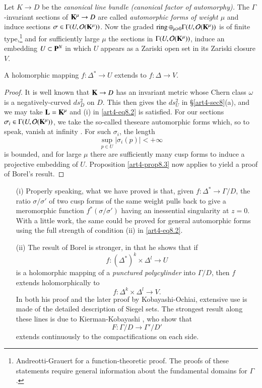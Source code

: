 Let $K \to D$ be the \textit{canonical line bundle (canonical factor of automorphy).} The $\Gamma$-invariant sections of $\mathbf{K}^\mu \to D$ are called \textit{automorphic forms of weight $\mu$} and induce sections $\sigma \in \Gamma (U, \mathcal{O} (\mathbf{K}^\mu))$. Now the graded $\operatorname{ring} \oplus_{\mu \geqslant 0} \Gamma (U, \mathcal{O}(\mathbf{K}^\mu))$ is of finite type,\footnote[36]{\cf Andreotti-Grauert \cite{art4-key1} for a function-theoretic proof. The proofs of these statements require general information about the fundamental domains for $\Gamma$.} and for sufficiently large $\mu$ the sections in $\Gamma (U,\mathcal{O} (\mathbf{K}^\mu))$, induce an embedding $U \subset \mathbf{P}^N$ in which $U$ appears as a Zariski open set in its Zariski closure $V$.

\setcounter{proposition}{11}
\begin{proposition}[Borel]\label{art4-eq8.12}
A holomorphic mapping $f : \Delta^\ast \to U$ extends to $f : \Delta \to V$.
\end{proposition}

\begin{proof}
It is well known that $\mathbf{K} \to D$ has an invariant metric whose Chern class $\omega$ is a negatively-curved $ds^2_D$ on $D$. This then gives the $ds^2_U$ in \S \ref{art4-sec8}(a), and we may take $\mathbf{L} = \mathbf{K}^\mu$ and (i) in \eqref{art4-eq8.2} is satisfied. For our sections $\sigma_i \in\Gamma (U,\mathcal{O} (\mathbf{K}^\mu))$, we take the so-called  these\pageoriginale are automorphic forms which, so to speak, vanish at infinity \cite{art4-key2}. For such $\sigma_i$, the length
$$
\sup_{p\in U} | \sigma_i(p) | < + \infty
$$
is bounded, and for large $\mu$ there are sufficiently many cusp forms to induce a projective embedding of $U$. Proposition \eqref{art4-prop8.3} now applies to yield a proof of Borel's result.
\end{proof}

\begin{remarks}
\begin{itemize}
\item[(i)] Properly speaking, what we have proved is that, given $f: \Delta^\ast \to \Gamma / D$, the ratio $\sigma/\sigma'$ of two cusp forms of the same weight pulls back to give a meromorphic function $f^\ast (\sigma/\sigma')$ having an inessential singularity at $z = 0$. With a little work, the same could  be proved for general automorphic forms using the full strength of condition (ii) in \eqref{art4-eq8.2}.

\item[(ii)] The result of Borel \cite{art4-key5} is stronger, in that he shows that if 
$$
f : (\Delta^\ast)^k \times \Delta^l \to U
$$
is a holomorphic mapping of a \textit{punctured polycylinder} into $\Gamma/D$, then $f$ extends holomorphically to
$$
f : \Delta^k \times \Delta^l \to V.
$$
In both his proof and the later proof by Kobayashi-Ochiai, extensive use is made of the detailed description of Siegel sets. The strongest result along these lines is due to Kierman-Kobayashi \cite{art4-key32}, who show that
$$
F: \Gamma / D \to \Gamma' / D'
$$
extends continuously to the compactifications on each side.
\end{itemize}
\end{remarks}

